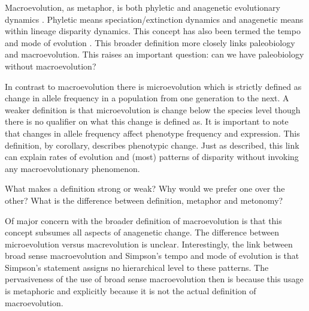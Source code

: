 \documentclass[12pt,letterpaper]{article}
\begin{document}
Macroevolution, as metaphor, is both phyletic and anagenetic evolutionary dynamics \citep{Foote2007b}. Phyletic means speciation/extinction dynamics and anagenetic means within lineage disparity dynamics. This concept has also been termed the tempo and mode of evolution \citep{Simpson1944}. This broader definition more closely links paleobiology and macroevolution. This raises an important question: can we have paleobiology without macroevolution?

In contrast to macroevolution there is microevolution \citep{Simpson1944,Foote2007b} which is strictly defined as change in allele frequency in a population from one generation to the next. A weaker definition is that microevolution is change below the species level \citep{Foote2007b} though there is no qualifier on what this change is defined as. It is important to note that changes in allele frequency affect phenotype frequency and expression. This definition, by corollary, describes phenotypic change. Just as \citet{Simpson1944} described, this link can explain rates of evolution and (most) patterns of disparity without invoking any macroevolutionary phenomenon.

What makes a definition strong or weak? Why would we prefer one over the other? What is the difference between definition, metaphor and metonomy?

Of major concern with the broader definition of macroevolution is that this concept subsumes all aspects of anagenetic change. The difference between microevolution versus macrevolution is unclear. Interestingly, the link between broad sense macroevolution and Simpson's tempo and mode of evolution is that Simpson's statement assigns no hierarchical level to these patterns. The pervasiveness of the use of broad sense macroevolution then is because this usage is metaphoric and explicitly because it is not the actual definition of macroevolution.
\end{document}
